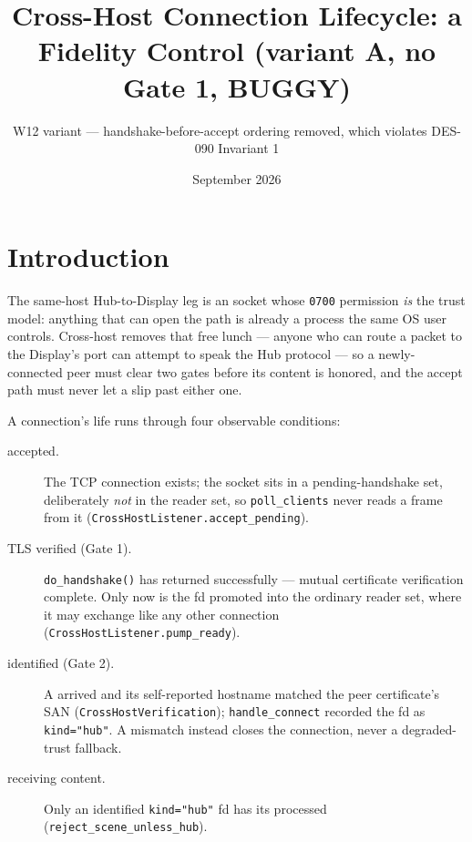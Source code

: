 \documentclass[a4paper,10pt,fleqn]{article}
\begin{document}
\title{Cross-Host Connection Lifecycle:
a Fidelity Control (variant A, no Gate 1, BUGGY)}
\author{W12 variant --- handshake-before-accept ordering removed, which
violates DES-090 Invariant 1}
\date{September 2026}
\maketitle

\noindent{}
\vspace{1em}

\section{Introduction}

The same-host Hub-to-Display leg is an  socket whose
\texttt{0700} permission \emph{is} the trust model: anything that can open
the path is already a process the same OS user controls.  Cross-host
removes that free lunch --- anyone who can route a packet to the
Display's port can attempt to speak the Hub protocol --- so a
newly-connected peer must clear two gates before its content is honored,
and the accept path must never let a  slip past either
one.

A connection's life runs through four observable conditions:

\begin{description}
  \item[accepted.] The TCP connection exists; the socket sits in a
    pending-handshake set, deliberately \emph{not} in the reader set, so
    \texttt{poll\_clients} never reads a frame from it
    (\texttt{CrossHostListener.accept\_pending}).
  \item[TLS verified (Gate 1).] \texttt{do\_handshake()} has returned
    successfully --- mutual certificate verification complete.  Only now
    is the fd promoted into the ordinary reader set, where it may exchange
     like any other connection
    (\texttt{CrossHostListener.pump\_ready}).
  \item[identified (Gate 2).] A  arrived and its
    self-reported  hostname matched the peer certificate's
    SAN (\texttt{CrossHostVerification}); \texttt{handle\_connect}
    recorded the fd as \texttt{kind="hub"}.  A mismatch instead closes the
    connection, never a degraded-trust fallback.
  \item[receiving content.] Only an identified \texttt{kind="hub"} fd has
    its  processed (\texttt{reject\_scene\_unless\_hub}).
\end{description}
\end{document}
